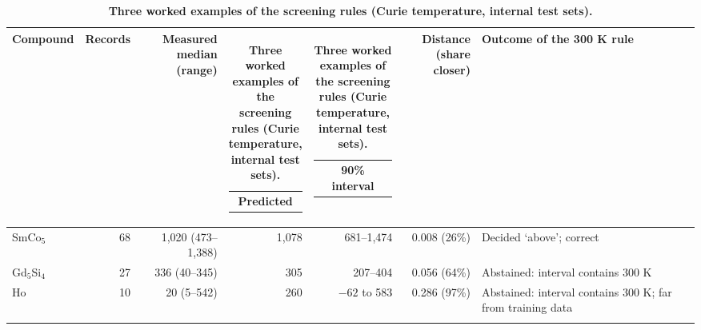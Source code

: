 \documentclass[pdflatex,sn-nature]{sn-jnl}
\makeatletter
\newcommand{\hd}[1]{\begin{tabular}[b]{@{}c@{}}#1\end{tabular}}
\makeatother
\begin{document}
\begin{table}[!ht]
\caption{\textbf{Three worked examples of the screening rules (Curie temperature, internal test sets).}}\label{tab:s24}%
\setlength{\tabcolsep}{3pt}%
\begin{tabular*}{\textwidth}{@{\extracolsep\fill}lrrrrr>{\raggedright\arraybackslash}p{66pt}@{}}
\toprule
Compound & Records & \hd{Measured\\median (range)} & \hd{Predicted} & \hd{90\% interval} & \hd{Distance\\(share closer)} & Outcome of the 300 K rule \\
\midrule
SmCo$_5$ & 68 & 1,020 (473--1,388) & 1,078 & 681--1,474 & 0.008 (26\%) & Decided `above'; correct \\
Gd$_5$Si$_4$ & 27 & 336 (40--345) & 305 & 207--404 & 0.056 (64\%) & Abstained: interval contains 300 K \\
Ho & 10 & 20 (5--542) & 260 & $-62$ to 583 & 0.286 (97\%) & Abstained: interval contains 300 K; far from training data \\
\botrule
\end{tabular*}
\end{table}
\end{document}
